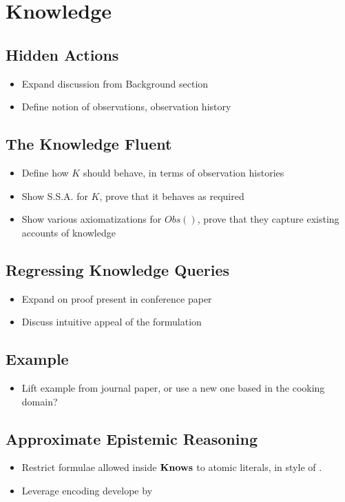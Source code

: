 


\chapter{Knowledge}

\label{ch:knowledge} %



\section{Hidden Actions}

\begin{itemize}
\item Expand discussion from Background section 
\item Define notion of observations, observation history 
\end{itemize}

\section{The Knowledge Fluent}

\begin{itemize}
\item Define how $K$ should behave, in terms of observation histories 
\item Show S.S.A. for $K$, prove that it behaves as required 
\item Show various axiomatizations for $Obs()$, prove that they capture
existing accounts of knowledge 
\end{itemize}

\section{Regressing Knowledge Queries}

\begin{itemize}
\item Expand on proof present in conference paper 
\item Discuss intuitive appeal of the formulation 
\end{itemize}

\section{Example}

\begin{itemize}
\item Lift example from journal paper, or use a new one based in the cooking
domain? 
\end{itemize}

\section{Approximate Epistemic Reasoning}

\begin{itemize}
\item Restrict formulae allowed inside $\mathbf{Knows}$ to atomic literals, in
style of \cite{demolombe00tractable_sc_belief}. 
\item Leverage encoding develope by \cite{petrick02knowledge_equivalence} 
\end{itemize}
